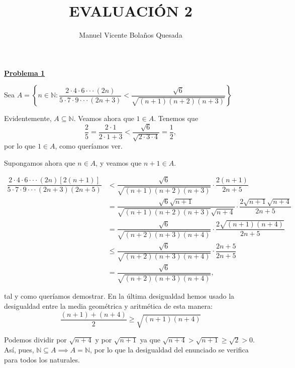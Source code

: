\documentclass[10pt,a4paper]{article}
\begin{document}
	\title{EVALUACIÓN 2}
	\author{Manuel Vicente Bolaños Quesada}
	\date{}
	\maketitle
	
	
	\begin{flushleft}
		\textbf{\underline{Problema 1}}
	\end{flushleft}

	Sea $A = \left\lbrace n \in \mathbb{N} : \dfrac{2 \cdot 4 \cdot 6 \cdot \cdot \cdot (2n)}{5 \cdot 7 \cdot 9 \cdot \cdot \cdot (2n + 3)} < \dfrac{\sqrt{6}}{\sqrt{(n+1)(n+2)(n+3)}}\right\rbrace $ \newline
	
	Evidentemente, $A \subseteq \mathbb{N}$. Veamos ahora que $1 \in A$. Tenemos que 
	$$ \dfrac{2}{5} = \dfrac{2 \cdot 1}{2 \cdot 1 + 3} < \dfrac{\sqrt{6}}{\sqrt{2 \cdot 3 \cdot 4}} = \dfrac{1}{2}, $$ por lo que $1 \in A$, como queríamos ver. \newline
	
	Supongamos ahora que $n \in A$, y veamos que $n+1 \in A$.
	
	\begin{equation*}
		\begin{split}
			\dfrac{2 \cdot 4 \cdot 6 \cdot \cdot \cdot (2n)[2(n+1)]}{5 \cdot 7 \cdot 9 \cdot \cdot \cdot (2n + 3)(2n+5)}
			& < \dfrac{\sqrt{6}}{\sqrt{(n+1)(n+2)(n+3)}} \cdot \dfrac{2(n+1)}{2n+5} \\
			& = \dfrac{\sqrt{6} \sqrt{n+1} }{\sqrt{(n+1)(n+2)(n+3)} \sqrt{n+4}} \cdot \dfrac{2 \sqrt{n+1} \sqrt{n+4}}{2n+5} \\
			& = \dfrac{\sqrt{6}}{\sqrt{(n+2)(n+3)(n+4)}} \cdot \dfrac{2 \sqrt{(n+1)(n+4)}}{2n+5} \\
			& \leq \dfrac{\sqrt{6}}{\sqrt{(n+2)(n+3)(n+4)}} \cdot \dfrac{2n+5}{2n+5} \\
			& = \dfrac{\sqrt{6}}{\sqrt{(n+2)(n+3)(n+4)}},
		\end{split}		
	\end{equation*}
	
	tal y como queríamos demostrar. En la última desigualdad hemos usado la desigualdad entre la media geométrica y aritmética de esta manera:
	$$\dfrac{(n+1) + (n+4)}{2} \geq \sqrt{(n+1)(n+4)}$$
	
	Podemos dividir por $\sqrt{n+4}$ y por $\sqrt{n+1}$ ya que $\sqrt{n+4} > \sqrt{n+1} \geq \sqrt{2} > 0$. Así, pues, $\mathbb{N} \subseteq A \implies A = \mathbb{N}$, por lo que la desigualdad del enunciado se verifica para todos los naturales.
	
\end{document}

